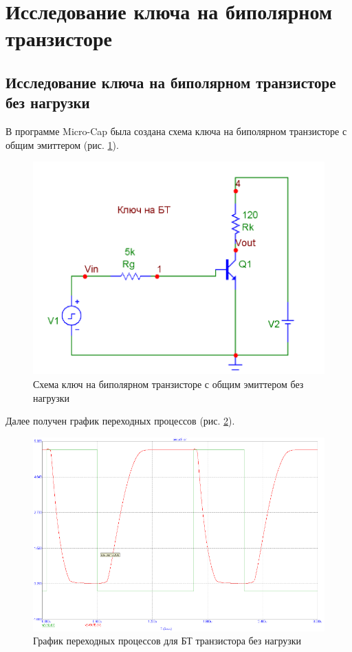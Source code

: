 \documentclass[a4paper,14pt]{article}
\begin{document}

\pagebreak
\section{Исследование ключа на биполярном транзисторе}
\subsection{Исследование ключа на биполярном транзисторе без нагрузки}

В программе Micro-Cap была создана схема ключа на биполярном транзисторе с общим эмиттером (рис. \ref{fig:btsh}).

\begin{figure}[H]
	\centering
	\includegraphics[width=0.7\linewidth]{image/BT_sh}
	\caption{Схема ключ на биполярном транзисторе с общим эмиттером без нагрузки}
	\label{fig:btsh}
\end{figure}

Далее получен график переходных процессов (рис. \ref{fig:btgrafper}).

\begin{figure}[H]
	\centering
	\includegraphics[width=0.7\linewidth]{image/BT_graf_per}
	\caption{График переходных процессов для БТ транзистора без нагрузки}
	\label{fig:btgrafper}
\end{figure}
\end{document}
